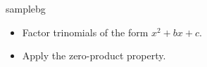 \begin{skillbox}{samplebg}
\begin{itemize}
  \item Factor trinomials of the form $x^2+bx+c$.
  \item Apply the zero-product property.
\end{itemize}
\end{skillbox}
